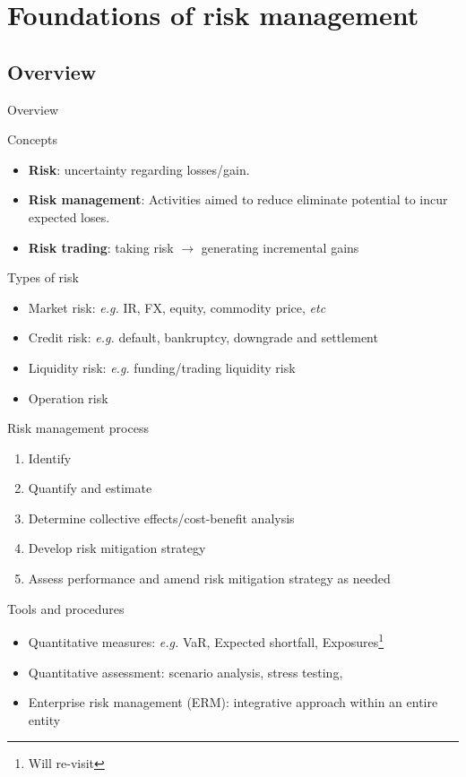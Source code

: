 \documentclass[10pt]{beamer}
\begin{document}
\section{Foundations of risk management}
\subsection{Overview}

\begin{frame}[allowframebreaks]{Overview}
\begin{block}{Concepts}
\begin{itemize}
	\item \textbf{Risk}: uncertainty regarding losses/gain.
	\item \textbf{Risk management}: Activities aimed to reduce eliminate potential to incur expected loses.
	\item \textbf{Risk trading}: taking risk $\to$ generating incremental gains
\end{itemize}
\end{block}

\begin{block}{Types of risk}
	\begin{itemize}
		\item Market risk: \textit{e.g.} IR, FX, equity, commodity price, \textit{etc}
		\item Credit risk: \textit{e.g.} default, bankruptcy, downgrade and settlement
		\item Liquidity risk: \textit{e.g.} funding/trading liquidity risk
		\item Operation risk
	\end{itemize}
\end{block}

\begin{block}{Risk management process}
	\begin{enumerate}
		\item Identify 
		\item Quantify and estimate
		\item Determine collective effects/cost-benefit analysis
		\item Develop risk mitigation strategy
		\item Assess performance and amend risk mitigation strategy as needed
	\end{enumerate}
\end{block}

\begin{block}{Tools and procedures}
	\begin{itemize}
		\item Quantitative measures: \textit{e.g.} VaR, Expected shortfall, Exposures\footnote{Will re-visit}  
		\item Quantitative assessment: scenario analysis, stress testing, 
		\item Enterprise risk management (ERM): integrative approach within an entire entity
	\end{itemize}
\end{block}


\end{frame}
\end{document}
